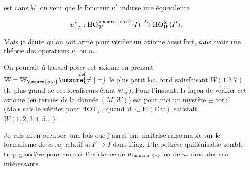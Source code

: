 
est dans $\mathbb{W}$, on veut que le foncteur $u^*$ induise une \uline{équivalence}

\[ u^{*}_{\mathrm{l.c.}}:\mathrm{HO}^{\unsure{\mathrm{lc}|\ell\mathrm{c}}}_W(I)\xrightarrow{\approx}\mathrm{HO}^{\mathrm{lc}}_W(I'). \]

Mais je doute qu'on soit armé pour vérifier un axiome aussi fort, sans avoir  une théorie des opérations $u_!$ ou $u_*$.

On pourrait à  hasard poser cet axiome  en prenant $\mathbb{W}=\mathbb{W}_{\unsure{\alpha|a}}\overset{\text{déf}}{\unsure{\ne|=}}$ le plus petit loc. fond satisfaisant $W(1\text{ à }7)$ (le plus grand de ces localiseurs étant $\mathbb{W}_\infty$). Pour l'instant, la façon de vérifier cet axiome  (en termes de la donnée $(M,W)$) est pour moi un mystère $\pm$ total. (Mais  sais le vérifier pour $\mathrm{HOT}_W$, quand $W\subset\mathrm{Fl}(\mathrm{Cat})$ satisfait $W(1,2,3,4,5\ldots)$

Je vais m'en occuper, une fois que j'aurai une maîtrise raisonnable sur le formalisme de $u_*,u_!$ relatif  $u:I'\to I$ dans $\mathrm{Diag}$. L'hypothèse quillénisable  semble trop grossière pour assurer l'existence de $u_{\unsure{!|*}}$ ou de $u_*$ dans des cas intéressants.
